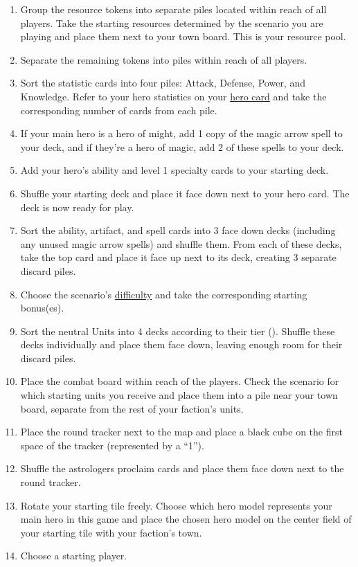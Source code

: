 \documentclass[12pt]{article}
\def\assets{assets}
\def\svgs{\assets/svgs}
\begin{document}
\begin{enumerate}
\item Group the resource tokens into separate piles located within reach of all players. Take the starting resources determined by the scenario you are playing and place them next to your town board. This is your resource pool.
\item Separate the remaining tokens into piles within reach of all players.
\item Sort the statistic cards into four piles: Attack, Defense, Power, and Knowledge. Refer to your hero statistics on your \hyperlink{Herocard}{hero card} and take the corresponding number of cards from each pile.
\item If your main hero is a hero of might, add 1 copy of the magic arrow spell to your deck, and if they’re a hero of magic, add 2 of these spells to your deck.
\item Add your hero’s ability and level 1 specialty cards to your starting deck.
\item Shuffle your starting deck and place it face down next to your hero card. The deck is now ready for play.
\item Sort the ability, artifact, and spell cards into 3 face down decks (including any unused magic arrow spells) and shuffle them. From each of these decks, take the top card and place it face up next to its deck, creating 3 separate discard piles.
\item Choose the scenario’s \hyperlink{Difficulty}{difficulty} and take the corresponding starting bonus(es).
\item Sort the neutral Units into 4 decks according to their tier (). Shuffle these decks individually and place them face down, leaving enough room for their discard piles.
\item Place the combat board within reach of the players. Check the scenario for which starting units you receive and place them into a pile near your town board, separate from the rest of your faction’s units.
\item Place the round tracker next to the map and place a black cube on the first space of the tracker (represented by a “1”).
\item Shuffle the astrologers proclaim cards and place them face down next to the round tracker.
\item Rotate your starting tile freely. Choose which hero model represents your main hero in this game and place the chosen hero model on the center field of your starting tile with your faction’s town.
\item Choose a starting player.

\end{enumerate}
\end{document}
